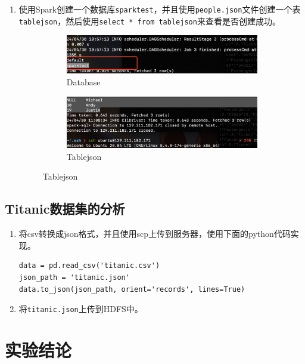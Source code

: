 \documentclass{article}
\begin{document}
\begin{enumerate}
\begin{figure}[H]
    \end{figure}
    \item 使用Spark创建一个数据库\texttt{sparktest}，并且使用\texttt{people.json}文件创建一个表
    \texttt{tablejson}，然后使用\texttt{select * from tablejson}来查看是否创建成功。
    \begin{figure}[H]
        \begin{subfigure}{0.5\textwidth}
            \centering
            \includegraphics[width=\textwidth]{databases.png}
            \caption*{Database}
        \end{subfigure}
        \hfill
        \begin{subfigure}{0.45\textwidth}
            \centering
            \includegraphics[width=\textwidth]{table.png}
            \caption*{Tablejson}
        \end{subfigure}
    \end{figure}
\end{enumerate}
\subsection{Titanic数据集的分析}
\begin{enumerate}
    \item 将csv转换成json格式，并且使用scp上传到服务器，使用下面的python代码实现。
    \begin{lstlisting}[style=pythonstyle]
data = pd.read_csv('titanic.csv')
json_path = 'titanic.json'
data.to_json(json_path, orient='records', lines=True)
    \end{lstlisting}
    \item 将\texttt{titanic.json}上传到HDFS中。
    \
\end{enumerate}
\section{实验结论}
\end{document}
